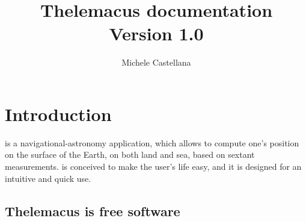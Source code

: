 \documentclass[]{book}
\title{Thelemacus documentation\\
\large{Version 1.0}}
\author{Michele Castellana}
\newcommand{\mycaption}[2]{\caption[#1]{\textbf{#1}. #2}}
\begin{document}
 

\maketitle 

\pagebreak
\tableofcontents

\chapter{Introduction}

\thel  is a navigational-astronomy application, which allows to compute one's position on the surface of the Earth, on both land and sea, based on sextant measurements. \thel is conceived to make the user's life easy, and it is designed for an intuitive and quick use. 

\section{Thelemacus is free software}



\printacronyms[pages={display=none,seq/use=false}]




\end{document}
